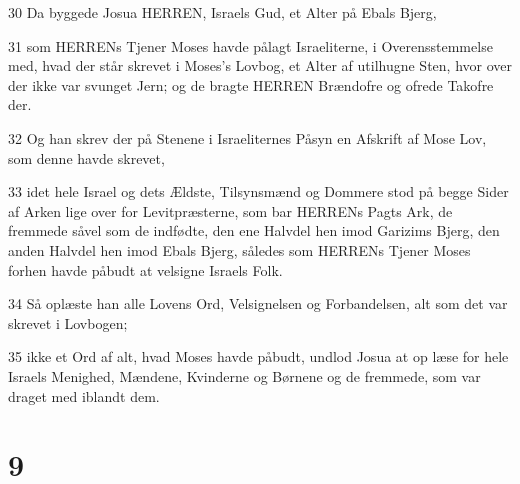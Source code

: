 \par 30 Da byggede Josua HERREN, Israels Gud, et Alter på Ebals Bjerg,
\par 31 som HERRENs Tjener Moses havde pålagt Israeliterne, i Overensstemmelse med, hvad der står skrevet i Moses's Lovbog, et Alter af utilhugne Sten, hvor over der ikke var svunget Jern; og de bragte HERREN Brændofre og ofrede Takofre der.
\par 32 Og han skrev der på Stenene i Israeliternes Påsyn en Afskrift af Mose Lov, som denne havde skrevet,
\par 33 idet hele Israel og dets Ældste, Tilsynsmænd og Dommere stod på begge Sider af Arken lige over for Levitpræsterne, som bar HERRENs Pagts Ark, de fremmede såvel som de indfødte, den ene Halvdel hen imod Garizims Bjerg, den anden Halvdel hen imod Ebals Bjerg, således som HERRENs Tjener Moses forhen havde påbudt at velsigne Israels Folk.
\par 34 Så oplæste han alle Lovens Ord, Velsignelsen og Forbandelsen, alt som det var skrevet i Lovbogen;
\par 35 ikke et Ord af alt, hvad Moses havde påbudt, undlod Josua at op læse for hele Israels Menighed, Mændene, Kvinderne og Børnene og de fremmede, som var draget med iblandt dem.

\chapter{9}

